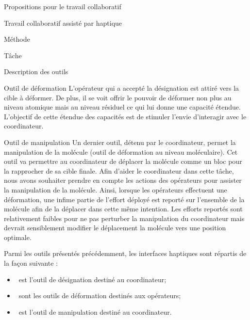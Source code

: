 \documentclass[myfrancais]{mythesis}
\begin{document}
\begin{mypart}{Propositions pour le travail collaboratif}
\begin{mychapter}{Travail collaboratif assisté par haptique}
\begin{mysection}{Méthode}
\begin{mysubsection}{Tâche}
\begin{mysubsubsection}{Description des outils}
\begin{myparagraph}{Outil de déformation}
							L'opérateur qui a accepté la désignation est attiré vers la cible à déformer.
							De plus, il se voit offrir le pouvoir de déformer non plus au niveau atomique mais au niveau résiduel ce qui lui donne une capacité étendue.
							L'objectif de cette étendue des capacités est de stimuler l'envie d'interagir avec le coordinateur.
						\end{myparagraph}
						\begin{myparagraph}{Outil de manipulation}
							Un dernier outil, détenu par le coordinateur, permet la manipulation de la molécule (outil de déformation au niveau moléculaire).
							Cet outil va permettre au coordinateur de déplacer la molécule comme un bloc pour la rapprocher de sa cible finale.
							Afin d'aider le coordinateur dans cette tâche, nous avons souhaiter prendre en compte les actions des opérateurs pour assister la manipulation de la molécule.
							Ainsi, lorsque les opérateurs effectuent une déformation, une infime partie de l'effort déployé est reporté sur l'ensemble de la molécule afin de la déplacer dans cette même intention.
							Les efforts reportés sont relativement faibles pour ne pas perturber la manipulation du coordinateur mais devrait sensiblement modifier le déplacement la molécule vers une position optimale.
						\end{myparagraph}

						Parmi les outils présentés précédemment, les interfaces haptiques sont répartis de la façon suivante :
						\begin{itemize}
							\item {}~\myOmni est l'outil de désignation destiné au coordinateur;
							\item {}~\myOmni sont les outils de déformation destinés aux opérateurs;
							\item {}~\myDesktop est l'outil de manipulation destiné au coordinateur.
						\end{itemize}


\end{mysubsubsection}
\end{mysubsection}
\end{mysection}
\end{mychapter}
\end{mypart}
\end{document}
